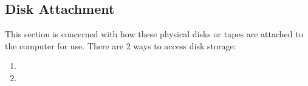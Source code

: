 \subsection{Disk Attachment}\label{subsec:Disk_Attachment}
This section is concerned with how these physical disks or tapes are attached to the computer for use.
There are 2 ways to access disk storage:
\begin{enumerate}[noitemsep]
\item {}
\item {}
\end{enumerate}


